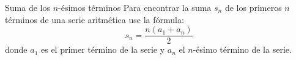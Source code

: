 \begin{infocard}{Suma de los $n$-ésimos términos}
    Para encontrar la suma $s_n$ de los primeros $n$ términos de una serie
    aritmética use la fórmula:
    \[s_n=\dfrac{n(a_1+a_n)}{2}\]
    donde $a_1$ es el primer término de la serie y $a_n$ el $n$-ésimo término
    de la serie.
\end{infocard}